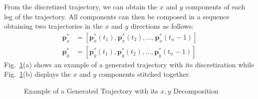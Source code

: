 \documentclass[letterpaper, 10 pt, conference]{ieeeconf}  %
\begin{document}
From the discretized trajectory, we can obtain the $x$ and $y$ components of each leg of the trajectory. All components can then be composed in a sequence obtaining two trajectories in the $x$ and $y$ directions as follows:
\begin{align}
    \bm{p}_x^*&=\left[ \bm{p}_x^*(t_1), \bm{p}_x^*(t_2), \ldots, \bm{p}_x^*(t_n-1)\right] \nonumber \\
    \bm{p}_y^*&=\left[ \bm{p}_y^*(t_1), \bm{p}_y^*(t_2), \ldots, \bm{p}_y^*(t_n-1)\right]
\end{align}
%
%
%
Fig.~\ref{fig:trajdec}(a) shows an example of a generated trajectory with its discretization while Fig.~\ref{fig:trajdec}(b) displays the $x$ and $y$ components stitched together.
\begin{figure}[h]
	\centering
	\caption{Example of a Generated Trajectory with its $x,y$ Decomposition}
	\label{fig:trajdec}
\end{figure}
\end{document}
